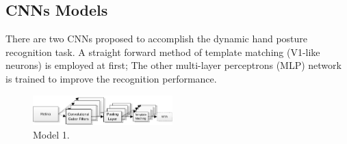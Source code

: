\documentclass[journal]{journal}
\begin{document}
%
%
%

\subsection{CNNs Models}
There are two CNNs proposed to accomplish the dynamic hand posture recognition task.
A straight forward method of template matching (V1-like neurons) is employed at first;
The other multi-layer perceptrons (MLP) network is trained to improve the recognition performance.

\begin{figure}[h!]
\centering
	\includegraphics[width=0.48\textwidth]{pics/model1.pdf}
	\caption{Model 1. 
	}
	\label{fig:model1}
\end{figure}
\end{document}
